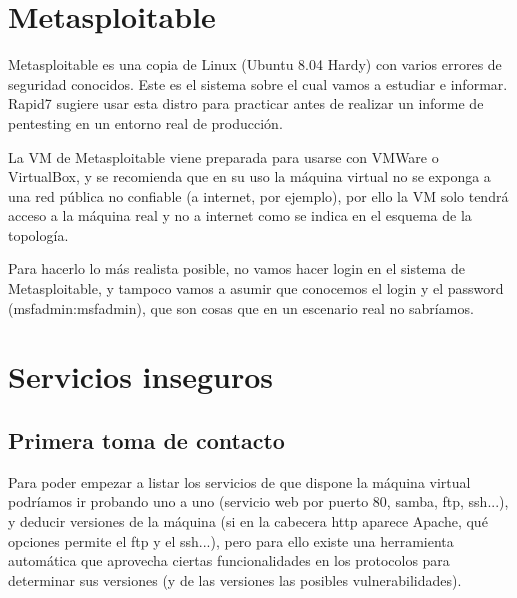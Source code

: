 \documentclass[a4paper,12pt]{scrartcl}
\begin{document}

\section{Metasploitable}

Metasploitable es una copia de Linux (Ubuntu 8.04 Hardy) con varios errores de seguridad conocidos. Este es el sistema sobre el cual vamos a estudiar e informar. Rapid7 sugiere usar esta distro para practicar antes de realizar un informe de pentesting en un entorno real de producción\cite{metasploitable}.

\vspace{10pt}

La VM de Metasploitable viene preparada para usarse con VMWare o VirtualBox, y se recomienda que en su uso la máquina virtual no se exponga a una red pública no confiable (a internet, por ejemplo), por ello la VM solo tendrá acceso a la máquina real y no a internet como se indica en el esquema de la topología.

\vspace{10pt}

Para hacerlo lo más realista posible, no vamos hacer login en el sistema de Metasploitable, y tampoco vamos a asumir que conocemos el login y el password (msfadmin:msfadmin), que son cosas que en un escenario real no sabríamos.

\section{Servicios inseguros}


\subsection{Primera toma de contacto}

Para poder empezar a listar los servicios de que dispone la máquina virtual podríamos ir probando uno a uno (servicio web por puerto 80, samba, ftp, ssh...), y deducir versiones de la máquina (si en la cabecera http aparece Apache, qué opciones permite el ftp y el ssh...), pero para ello existe una herramienta automática que aprovecha ciertas funcionalidades en los protocolos para determinar sus versiones (y de las versiones las posibles vulnerabilidades).

\vspace{10pt}
\end{document}
